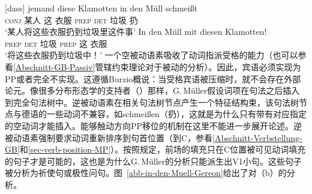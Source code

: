 \begin{exe}
\begin{xlist}[iv.]
\begin{exe}
\begin{xlist}[iv.]
\eal
\ex 
\gll {}[dass] jemand diese Klamotten in den Müll schmeißt\\
     {}\spacebr{}\textsc{conj} 某人 这 衣服 \textsc{prep} \textsc{det} 垃圾 扔\\
\glt `某人将这些衣服扔到垃圾里这件事'     
\ex\label{in-den-Muell-mit} 
\gll In den Müll mit diesen Klamotten!\\
     \textsc{prep} \textsc{det} 垃圾 \textsc{prep} 这 衣服\\
\glt `将这些衣服扔到垃圾中！'
\zl
一个空被动语素吸收了动词指派受格的能力（也可以参看\ref{Abschnitt-GB-Passiv}管辖约束理论对于被动的分析）。因此，宾语必须实现为PP或者完全不实现。这遵循Burzio概说：当受格宾语被压缩时，就不会存在外部论元。像很多分布形态学的支持者（\egc \citealp{Marantz97a}）那样，G.\,Müller假设词项在句法之后插入到完全句法树中。逆被动语素在相关句法树节点产生一个特征结构束，该句法树节点与德语的一些动词不兼容，如schmeißen（扔），这就是为什么只有带有对应指定的空动词才能插入。能够触动方向PP移位的机制在这里不能进一步展开论述。逆被动语素强制要求动词重新排序到句首位置（到C，参看\ref{Abschnitt-Verbstellung-GB}和\ref{sec-verb-position-MP}）。按照规定，前场的填充只在C位置被可见动词填充的句子才是可能的，这也是为什么G.\,Müller的分析只能派生出V1小句。这些句子被分析为祈使句或极性问句。图~\vref{abb-in-den-Muell-Gereon}给出了对（b）的分析。

\end{xlist}
\end{exe}
\end{xlist}
\end{exe}
